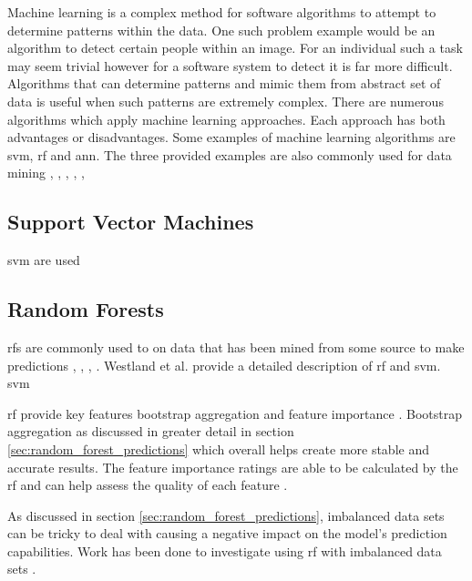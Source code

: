 Machine learning is a complex method for software algorithms to attempt to determine patterns within the data. One such problem example would be an algorithm to detect certain people within an image. For an individual such a task may seem trivial however for a software system to detect it is far more difficult. Algorithms that can determine patterns and mimic them from abstract set of data is useful when such patterns are extremely complex. There are numerous algorithms which apply machine learning approaches. Each approach has both advantages or disadvantages. Some examples of machine learning algorithms are \gls{svm}, \gls{rf} and \gls{ann}. The three provided examples are also commonly used for data mining \cite{Alam2013}, \cite{Granitto2007}, \cite{Stojanova}, \cite{Westland2011}, \cite{Yu2011}, \cite{Huang2007} %

\subsection{Support Vector Machines}

\gls{svm} are used \cite{Jalbert2012}


\subsection{Random Forests}


\gls{rf}s are commonly used to on data that has been mined from some source to make predictions \cite{Alam2013}, \cite{Granitto2007}, \cite{Stojanova}, \cite{Yu2011}. Westland et al. provide a detailed description of \gls{rf} and \gls{svm}. \gls{svm} %

\gls{rf} provide key features bootstrap aggregation and feature importance \cite{Westland2011}. Bootstrap aggregation as discussed in greater detail in section \ref{sec:random_forest_predictions} which overall helps create more stable and accurate results. The feature importance ratings are able to be calculated by the \gls{rf} and can help assess the quality of each feature \cite{Verikas2011}.

As discussed in section \ref{sec:random_forest_predictions}, imbalanced data sets can be tricky to deal with causing a negative impact on the model's prediction capabilities. Work has been done to investigate using \gls{rf} with imbalanced data sets \cite{Khoshgoftaar2007}. %


